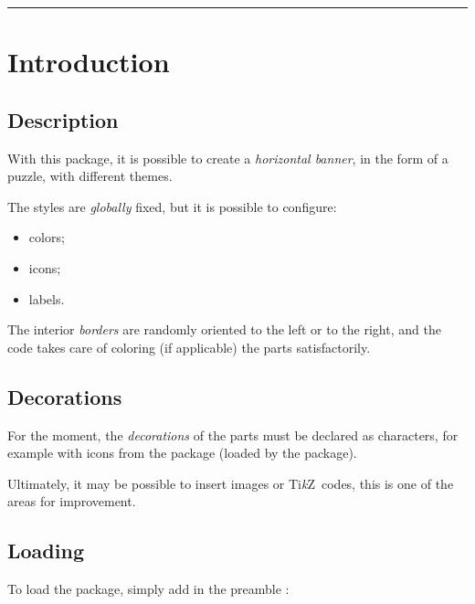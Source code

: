\documentclass[11pt,a4paper]{ltxdoc}
\providecommand\tikzlogo{Ti\textit{k}Z}
\let\TikZ\tikzlogo
\begin{document}
\pagebreak


\hypertarget{matoc}{}

\tableofcontents

\vspace*{5mm}

\hrule

\vspace*{5mm}

\section{Introduction}

\subsection{Description}

With this package, it is possible to create a \textit{horizontal banner}, in the form of a puzzle, with different themes.

The styles are \textit{globally} fixed, but it is possible to configure:

\begin{itemize}
	\item colors;
	\item icons;
	\item labels.
\end{itemize}

The interior \textit{borders} are randomly oriented to the left or to the right, and the code takes care of coloring (if applicable) the parts satisfactorily.

\subsection{Decorations}

For the moment, the \textit{decorations} of the parts must be declared as characters, for example with icons from the  package (loaded by the package).

\smallskip

Ultimately, it may be possible to insert images or \TikZ\ codes, this is one of the areas for improvement.

\subsection{Loading}

To load the package, simply add in the preamble :
\end{document}
